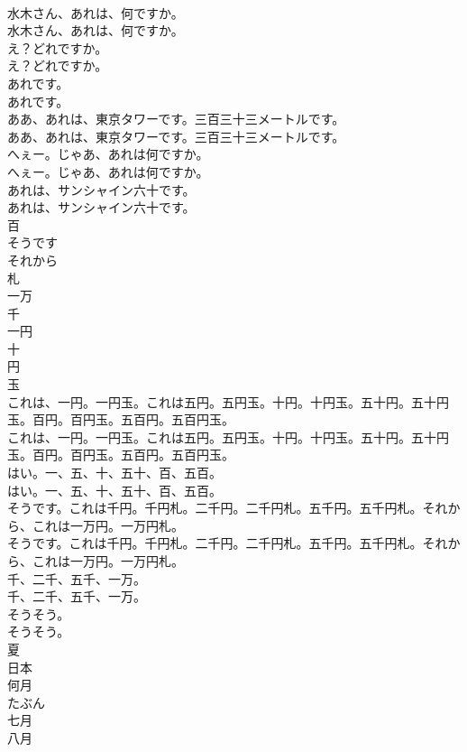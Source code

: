 \documentclass[8pt]{extreport}
\begin{document}
\begin{CJK}{UTF8}{min}
\\	水木さん、あれは、何ですか。	
\\	水木さん、あれは、何ですか。 
\\	え？どれですか。	
\\	え？どれですか。 
\\	あれです。	
\\	あれです。 
\\	ああ、あれは、東京タワーです。三百三十三メートルです。	
\\	ああ、あれは、東京タワーです。三百三十三メートルです。 
\\	へぇー。じゃあ、あれは何ですか。	
\\	へぇー。じゃあ、あれは何ですか。 
\\	あれは、サンシャイン六十です。	
\\	あれは、サンシャイン六十です。 
\\	百
\\	そうです
\\	それから
\\	札
\\	一万
\\	千
\\	一円
\\	十
\\	円
\\	玉
\\	これは、一円。一円玉。これは五円。五円玉。十円。十円玉。五十円。五十円玉。百円。百円玉。五百円。五百円玉。	
\\	これは、一円。一円玉。これは五円。五円玉。十円。十円玉。五十円。五十円玉。百円。百円玉。五百円。五百円玉。 
\\	はい。一、五、十、五十、百、五百。	
\\	はい。一、五、十、五十、百、五百。 
\\	そうです。これは千円。千円札。二千円。二千円札。五千円。五千円札。それから、これは一万円。一万円札。	
\\	そうです。これは千円。千円札。二千円。二千円札。五千円。五千円札。それから、これは一万円。一万円札。 
\\	千、二千、五千、一万。	
\\	千、二千、五千、一万。 
\\	そうそう。	
\\	そうそう。 
\\	夏
\\	日本
\\	何月
\\	たぶん
\\	七月
\\	八月

\end{CJK}
\end{document}
